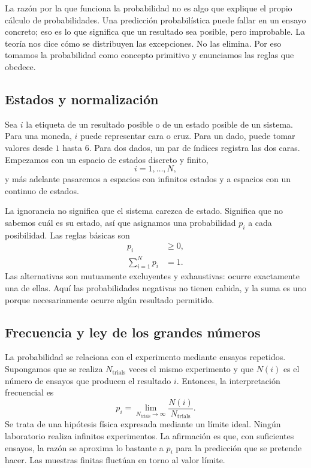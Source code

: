 La razón por la que funciona la probabilidad no es algo que explique el propio cálculo de probabilidades. Una predicción probabilística puede fallar en un ensayo concreto; eso es lo que significa que un resultado sea posible, pero improbable. La teoría nos dice cómo se distribuyen las excepciones. No las elimina. Por eso tomamos la probabilidad como concepto primitivo y enunciamos las reglas que obedece.

\subsection{Estados y normalización}

Sea \(i\) la etiqueta de un resultado posible o de un estado posible de un sistema. Para una moneda, \(i\) puede representar cara o cruz. Para un dado, puede tomar valores desde \(1\) hasta \(6\). Para dos dados, un par de índices registra las dos caras. Empezamos con un espacio de estados discreto y finito,
\begin{equation}
 i=1,\ldots,N,
\end{equation}
y más adelante pasaremos a espacios con infinitos estados y a espacios con un continuo de estados.

La ignorancia no significa que el sistema carezca de estado. Significa que no sabemos cuál es su estado, así que asignamos una probabilidad \(p_i\) a cada posibilidad. Las reglas básicas son
\begin{align}
 p_i &\geq 0, \label{eq:sm1-prob-positive}\\
 \sum_{i=1}^{N}p_i &=1. \label{eq:sm1-prob-normalization}
\end{align}
Las alternativas son mutuamente excluyentes y exhaustivas: ocurre exactamente una de ellas. Aquí las probabilidades negativas no tienen cabida, y la suma es uno porque necesariamente ocurre algún resultado permitido.

\subsection{Frecuencia y ley de los grandes números}

La probabilidad se relaciona con el experimento mediante ensayos repetidos. Supongamos que se realiza \(N_{\mathrm{trials}}\) veces el mismo experimento y que \(N(i)\) es el número de ensayos que producen el resultado \(i\). Entonces, la interpretación frecuencial es
\begin{equation}
 p_i=
 \lim_{N_{\mathrm{trials}}\to\infty}
 \frac{N(i)}{N_{\mathrm{trials}}}.
 \label{eq:sm1-frequency}
\end{equation}
Se trata de una hipótesis física expresada mediante un límite ideal. Ningún laboratorio realiza infinitos experimentos. La afirmación es que, con suficientes ensayos, la razón se aproxima lo bastante a \(p_i\) para la predicción que se pretende hacer. Las muestras finitas fluctúan en torno al valor límite.

